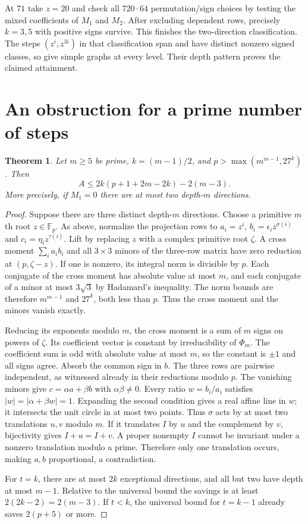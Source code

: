 \documentclass[11pt]{article}
\newtheorem{theorem}{Theorem}
\newcommand{\F}{\mathbb F}
\begin{document}
At $71$ take $z=20$ and check all $720\cdot64$ permutation/sign
choices by testing the mixed coefficients of $M_1$ and $M_2$.
After excluding dependent rows, precisely $k=3,5$ with positive
signs survive. This finishes the two-direction classification.
The steps $(z^i,z^{3i})$ in that classification span and have
distinct nonzero signed classes, so give simple graphs at every
level. Their depth pattern proves the claimed attainment.

\section{An obstruction for a prime number of steps}
\begin{theorem}
Let $m\ge5$ be prime, $k=(m-1)/2$, and
$p>\max(m^{m-1},27^k)$. Then
\[
 A\le 2k(p+1+2m-2k)-2(m-3).
\]
More precisely, if $M_1=0$ there are at most two depth-$m$
directions.
\end{theorem}
\begin{proof}
Suppose there are three distinct depth-$m$ directions. Choose a
primitive $m$th root $z\in\F_p$. As above, normalize the projection
rows to $a_i=z^i$, $b_i=\epsilon_i z^{\sigma(i)}$ and
$c_i=\eta_i z^{\tau(i)}$. Lift by replacing $z$ with a complex
primitive root $\zeta$. A cross moment $\sum_i a_i b_i$ and
all $3\times3$ minors of the three-row matrix have zero reduction
at $(p,\zeta-z)$. If one is nonzero, its integral norm is
divisible by $p$. Each conjugate of the cross moment has
absolute value at most $m$, and each conjugate of a minor at
most $3\sqrt3$ by Hadamard's inequality. The norm bounds are
therefore $m^{m-1}$ and $27^k$, both less than $p$. Thus the
cross moment and the minors vanish exactly.

Reducing its exponents modulo $m$, the cross moment is a sum of
$m$ signs on powers of $\zeta$. Its coefficient vector is
constant by irreducibility of $\Phi_m$. The coefficient sum is
odd with absolute value at most $m$, so the constant is $\pm1$
and all signs agree. Absorb the common sign in $b$.
The three rows are pairwise independent, as witnessed already
in their reductions modulo $p$. The vanishing minors give
$c=\alpha a+\beta b$ with $\alpha\beta\ne0$.
Every ratio $w=b_i/a_i$ satisfies $|w|=|\alpha+\beta w|=1$.
Expanding the second condition gives a real affine line in $w$;
it intersects the unit circle in at most two points.
Thus $\sigma$ acts by at most two translations $u,v$ modulo $m$.
If it translates $I$ by $u$ and the complement by $v$, bijectivity
gives $I+u=I+v$. A proper nonempty $I$ cannot be invariant
under a nonzero translation modulo a prime. Therefore only one
translation occurs, making $a,b$ proportional, a contradiction.

For $t=k$, there are at most $2k$ exceptional directions, and
all but two have depth at most $m-1$. Relative to the universal
bound the savings is at least $2(2k-2)=2(m-3)$. If $t<k$,
the universal bound for $t=k-1$ already saves $2(p+5)$ or more.
\end{proof}
\end{document}
